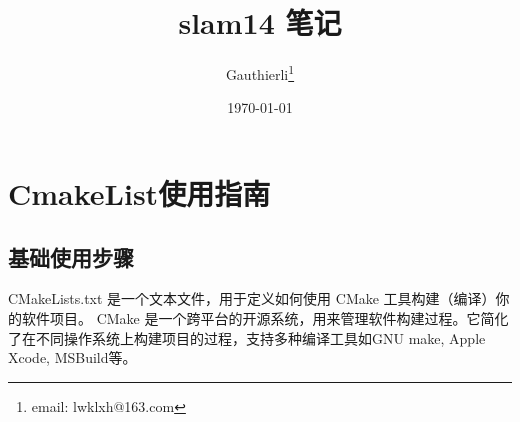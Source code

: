 \documentclass{article}
\title{\textbf{slam14 笔记}}
\author{Gauthierli\footnote{email: lwklxh@163.com}}
\date{\today}
\begin{document}
\maketitle
\newpage
\tableofcontents
\newpage

\section{CmakeList使用指南}
\subsection{基础使用步骤}
CMakeLists.txt 是一个文本文件，用于定义如何使用 CMake 工具构建（编译）你的软件项目。
CMake 是一个跨平台的开源系统，用来管理软件构建过程。它简化了在不同操作系统上构建项目的过程，支持多种编译工具如GNU make, Apple Xcode, MSBuild等。
\end{document}
